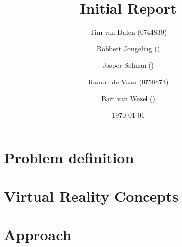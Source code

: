 \documentclass[a4paper,11pt]{article}
\title{
	Initial Report
}
\author{
	Tim van Dalen (0744839)
	\and
	Robbert Jongeling ()
	\and
	Jasper Selman ()
	\and
	Ramon de Vaan (0758873)
	\and
	Bart van Wezel ()
}
\date{\today}
\begin{document}
	\maketitle
	
	\begin{abstract}
		
	\end{abstract}
	
	\section{Problem definition}
	\label{sec:problem}
	
	
	\section{Virtual Reality Concepts}
	\label{sec:vr}
	
	
	\section{Approach}
	\label{sec:approach}
	
	
	
\end{document}
